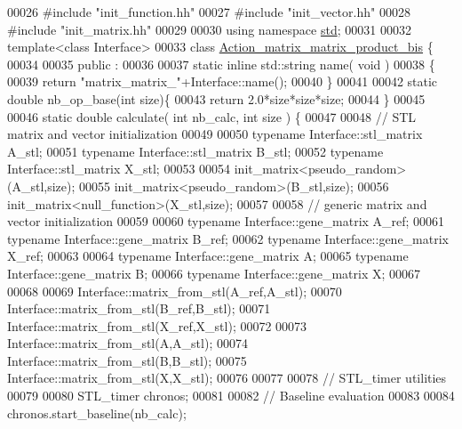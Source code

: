 \begin{DoxyCode}
00026 \textcolor{preprocessor}{#include "init\_function.hh"}
00027 \textcolor{preprocessor}{#include "init\_vector.hh"}
00028 \textcolor{preprocessor}{#include "init\_matrix.hh"}
00029 
00030 \textcolor{keyword}{using namespace }\hyperlink{namespacestd}{std};
00031 
00032 \textcolor{keyword}{template}<\textcolor{keyword}{class} Interface>
00033 \textcolor{keyword}{class }\hyperlink{class_action__matrix__matrix__product__bis}{Action\_matrix\_matrix\_product\_bis} \{
00034 
00035 public :
00036 
00037   \textcolor{keyword}{static} \textcolor{keyword}{inline} std::string name( \textcolor{keywordtype}{void} )
00038   \{
00039     \textcolor{keywordflow}{return} \textcolor{stringliteral}{"matrix\_matrix\_"}+Interface::name();
00040   \}
00041 
00042   \textcolor{keyword}{static} \textcolor{keywordtype}{double} nb\_op\_base(\textcolor{keywordtype}{int} size)\{
00043     \textcolor{keywordflow}{return} 2.0*size*size*size;
00044   \}
00045 
00046   \textcolor{keyword}{static} \textcolor{keywordtype}{double} calculate( \textcolor{keywordtype}{int} nb\_calc, \textcolor{keywordtype}{int} size ) \{
00047 
00048     \textcolor{comment}{// STL matrix and vector initialization}
00049 
00050     \textcolor{keyword}{typename} Interface::stl\_matrix A\_stl;
00051     \textcolor{keyword}{typename} Interface::stl\_matrix B\_stl;
00052     \textcolor{keyword}{typename} Interface::stl\_matrix X\_stl;
00053 
00054     init\_matrix<pseudo\_random>(A\_stl,size);
00055     init\_matrix<pseudo\_random>(B\_stl,size);
00056     init\_matrix<null\_function>(X\_stl,size);
00057 
00058     \textcolor{comment}{// generic matrix and vector initialization}
00059 
00060     \textcolor{keyword}{typename} Interface::gene\_matrix A\_ref;
00061     \textcolor{keyword}{typename} Interface::gene\_matrix B\_ref;
00062     \textcolor{keyword}{typename} Interface::gene\_matrix X\_ref;
00063 
00064     \textcolor{keyword}{typename} Interface::gene\_matrix A;
00065     \textcolor{keyword}{typename} Interface::gene\_matrix B;
00066     \textcolor{keyword}{typename} Interface::gene\_matrix X;
00067 
00068 
00069     Interface::matrix\_from\_stl(A\_ref,A\_stl);
00070     Interface::matrix\_from\_stl(B\_ref,B\_stl);
00071     Interface::matrix\_from\_stl(X\_ref,X\_stl);
00072 
00073     Interface::matrix\_from\_stl(A,A\_stl);
00074     Interface::matrix\_from\_stl(B,B\_stl);
00075     Interface::matrix\_from\_stl(X,X\_stl);
00076 
00077 
00078     \textcolor{comment}{// STL\_timer utilities}
00079 
00080     STL\_timer chronos;
00081 
00082     \textcolor{comment}{// Baseline evaluation}
00083 
00084     chronos.start\_baseline(nb\_calc);

\end{DoxyCode}
